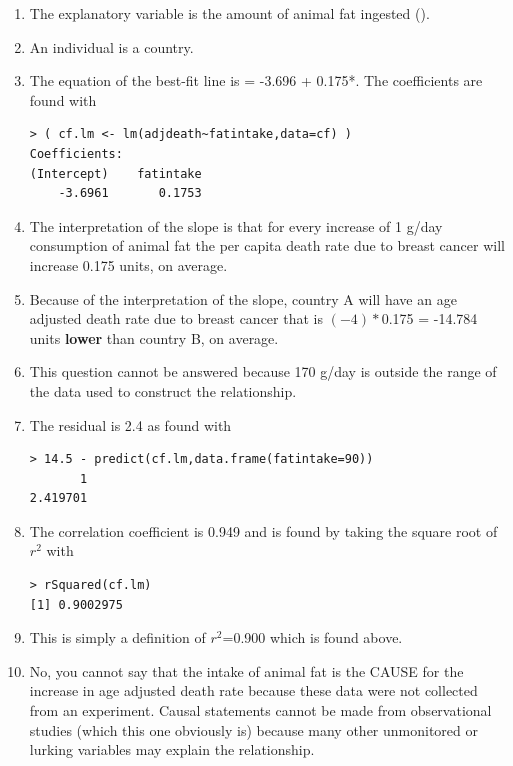 \documentclass[10pt,openany]{book}\usepackage[]{graphicx}\usepackage[]{color}
\makeatletter
\newenvironment{kframe}{%
 \def\at@end@of@kframe{}%
 \ifinner\ifhmode%
  \def\at@end@of@kframe{\end{minipage}}%
  \begin{minipage}{\columnwidth}%
 \fi\fi%
 \def\FrameCommand##1{\hskip\@totalleftmargin \hskip-\fboxsep
 \colorbox{shadecolor}{##1}\hskip-\fboxsep
     \hskip-\linewidth \hskip-\@totalleftmargin \hskip\columnwidth}%
 \MakeFramed {\advance\hsize-\width
   \@totalleftmargin\z@ \linewidth\hsize
   \@setminipage}}%
 {\par\unskip\endMakeFramed%
 \at@end@of@kframe}
\newenvironment{knitrout}{}{} %
\makeatother
\begin{document}
\begin{itemize}
    \begin{enumerate}
      \item The explanatory variable is the amount of animal fat ingested ().
      \item An individual is a country.
      \item The equation of the best-fit line is  = -3.696 + 0.175*.  The coefficients are found with
\begin{knitrout}
\color{fgcolor}\begin{kframe}
\begin{verbatim}
> ( cf.lm <- lm(adjdeath~fatintake,data=cf) )
Coefficients:
(Intercept)    fatintake  
    -3.6961       0.1753  
\end{verbatim}
\end{kframe}
\end{knitrout}
      \item The interpretation of the slope is that for every increase of 1 g/day consumption of animal fat the per capita death rate due to breast cancer will increase 0.175 units, on average.
      \item Because of the interpretation of the slope, country A will have an age adjusted death rate due to breast cancer that is $(-4)*$0.175 = -14.784 units \textbf{lower} than country B, on average.
      \item This question cannot be answered because 170 g/day is outside the range of the  data used to construct the relationship.
      \item  The residual is 2.4 as found with
\begin{knitrout}
\color{fgcolor}\begin{kframe}
\begin{verbatim}
> 14.5 - predict(cf.lm,data.frame(fatintake=90))
       1 
2.419701 
\end{verbatim}
\end{kframe}
\end{knitrout}
      \item The correlation coefficient is 0.949 and is found by taking the square root of $r^{2}$ with
\begin{knitrout}
\color{fgcolor}\begin{kframe}
\begin{verbatim}
> rSquared(cf.lm)
[1] 0.9002975
\end{verbatim}
\end{kframe}
\end{knitrout}
      \item This is simply a definition of $r^{2}$=0.900 which is found above.
      \item No, you cannot say that the intake of animal fat is the CAUSE for the increase in age adjusted death rate because these data were not collected from an experiment. Causal statements cannot be made from observational studies (which this one obviously is) because many other unmonitored or lurking variables may explain the relationship.
    \end{enumerate}


\end{itemize}
\end{document}
